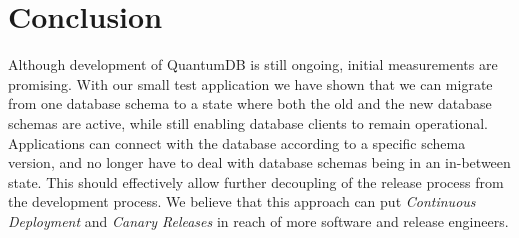 \documentclass[conference]{IEEEtran}
\begin{document}
\section{Conclusion} 

Although development of QuantumDB is still ongoing, initial measurements are promising. With our small test application we have shown that we can migrate from one database schema to a state where both the old and the new database schemas are active, while still enabling database clients to remain operational. Applications can connect with the database according to a specific schema version, and no longer have to deal with database schemas being in an in-between state. This should effectively allow further decoupling of the release process from the development process. We believe that this approach can put \textit{Continuous Deployment} and \textit{Canary Releases} in reach of more software and release engineers.















%
%
%




% 
% 




\end{document}
